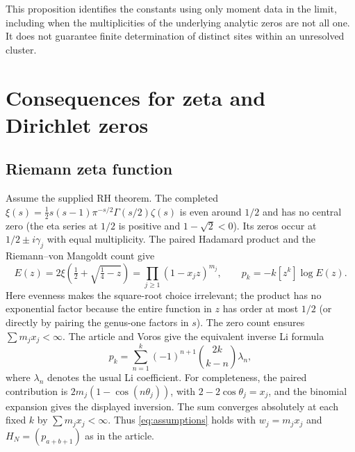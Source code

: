 \documentclass[11pt]{article}
\theoremstyle{remark}\newtheorem{remark}[theorem]{Remark}
\begin{document}
This proposition identifies the constants using only moment data in the limit, including when the multiplicities of the underlying analytic zeros are not all one. It does not guarantee finite determination of distinct sites within an unresolved cluster.

\section{Consequences for zeta and Dirichlet zeros}
\subsection{Riemann zeta function}
Assume the supplied RH theorem. The completed $\xi(s)=\tfrac12s(s-1)\pi^{-s/2}\Gamma(s/2)\zeta(s)$ is even around $1/2$ and has no central zero (the eta series at $1/2$ is positive and $1-\sqrt2<0$). Its zeros occur at $1/2\pm i\gamma_j$ with equal multiplicity. The paired Hadamard product and the Riemann--von Mangoldt count give
\[
 E(z)=2\xi\left(\tfrac12+\sqrt{\tfrac14-z}\right)=\prod_{j\ge1}(1-x_jz)^{m_j},\qquad
 p_k=-k[z^k]\log E(z).
\]
Here evenness makes the square-root choice irrelevant; the product has no exponential factor because the entire function in $z$ has order at most $1/2$ (or directly by pairing the genus-one factors in $s$). The zero count ensures $\sum m_jx_j<\infty$. The article and Voros give the equivalent inverse Li formula \cite{li,voros}
\[
 p_k=\sum_{n=1}^k(-1)^{n+1}\binom{2k}{k-n}\lambda_n,
\]
where $\lambda_n$ denotes the usual Li coefficient. For completeness, the paired contribution is $2m_j(1-\cos(n\theta_j))$, with $2-2\cos\theta_j=x_j$, and the binomial expansion gives the displayed inversion. The sum converges absolutely at each fixed $k$ by $\sum m_jx_j<\infty$. Thus \eqref{eq:assumptions} holds with $w_j=m_jx_j$ and $H_N=(p_{a+b+1})$ as in the article.
\end{document}

